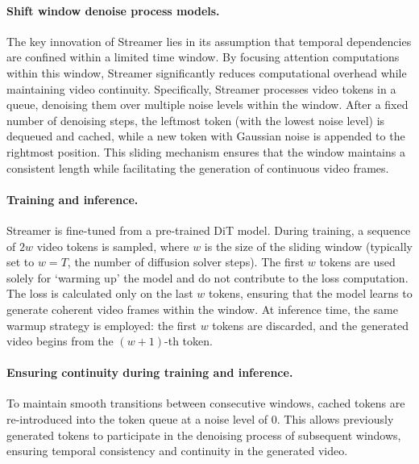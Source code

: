 \paragraph{Shift window denoise process models.} The key innovation of Streamer lies in its assumption that temporal dependencies are confined within a limited time window. By focusing attention computations within this window, Streamer significantly reduces computational overhead while maintaining video continuity. Specifically, Streamer processes video tokens in a queue, denoising them over multiple noise levels within the window. After a fixed number of denoising steps, the leftmost token (with the lowest noise level) is dequeued and cached, while a new token with Gaussian noise is appended to the rightmost position. This sliding mechanism ensures that the window maintains a consistent length while facilitating the generation of continuous video frames.

\paragraph{Training and inference.}
Streamer is fine-tuned from a pre-trained DiT model. During training, a sequence of $2w$ video tokens is sampled, where $w$ is the size of the sliding window (typically set to $w=T$, the number of diffusion solver steps). The first $w$ tokens are used solely for `warming up' the model and do not contribute to the loss computation. The loss is calculated only on the last $w$ tokens, ensuring that the model learns to generate coherent video frames within the window. At inference time, the same warmup strategy is employed: the first $w$ tokens are discarded, and the generated video begins from the $(w+1)$-th token.

\paragraph{Ensuring continuity during training and inference.}
To maintain smooth transitions between consecutive windows, cached tokens are re-introduced into the token queue at a noise level of 0. This allows previously generated tokens to participate in the denoising process of subsequent windows, ensuring temporal consistency and continuity in the generated video.

